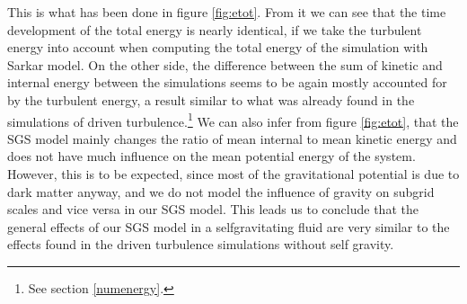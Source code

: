 This is what has been done in figure \ref{fig:etot}. From it we can see
that the time development of the total energy is nearly identical, if we take
the turbulent energy into account when computing the total energy of the
simulation with Sarkar model. On the other side, the difference between the sum
of kinetic and internal energy between the simulations seems to be again mostly
accounted for by the turbulent energy, a result similar to what was already
found in the simulations of driven turbulence.\footnote{See section
\ref{numenergy}.}
We can also infer from figure \ref{fig:etot}, that the SGS model mainly changes
the ratio of mean internal to mean kinetic energy and does not have much
influence on the mean potential energy of the system. However, this is to be
expected, since most of the gravitational potential is due to dark matter
anyway, and we do not model the influence of gravity on subgrid scales and vice
versa in our SGS model. This leads us to conclude that the general effects of
our SGS model in a selfgravitating fluid are very similar to the effects found
in the driven turbulence simulations without self gravity.  

